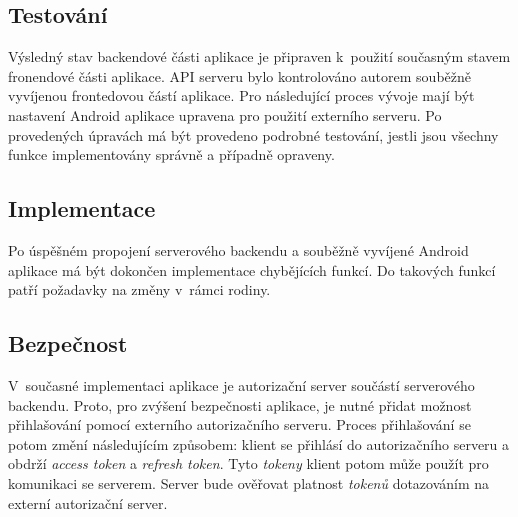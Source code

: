     \subsection{Testování}
        Výsledný stav backendové části aplikace je připraven k~použití současným stavem fronendové části aplikace. API serveru bylo kontrolováno autorem souběžně vyvíjenou frontedovou částí aplikace. Pro následující proces vývoje mají být nastavení Android aplikace upravena pro použití externího serveru. Po provedených úpravách má být provedeno podrobné testování, jestli jsou všechny funkce implementovány správně a případně opraveny.
    
    \subsection{Implementace}
        Po úspěšném propojení serverového backendu a souběžně vyvíjené Android aplikace má být dokončen implementace chybějících funkcí. Do takových funkcí patří požadavky na změny v~rámci rodiny. 
        
    \subsection{Bezpečnost}
        V~současné implementaci aplikace je autorizační server součástí serverového backendu. Proto, pro zvýšení bezpečnosti aplikace, je nutné přidat možnost přihlašování pomocí externího autorizačního serveru. Proces přihlašování se potom změní následujícím způsobem: klient se přihlásí do autorizačního serveru a obdrží \textit{access token} a \textit{refresh token}. 
        Tyto \textit{tokeny} klient potom může použít pro komunikaci se serverem. Server bude ověřovat platnost \textit{tokenů} dotazováním na externí autorizační server.
